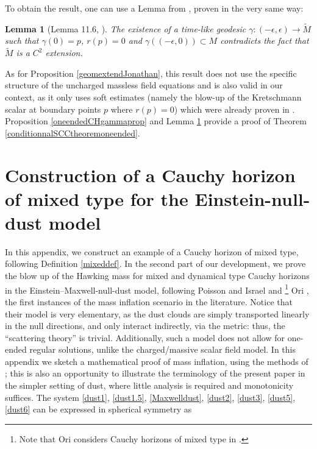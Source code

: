 \documentclass[10pt,a4paper]{article}
\theoremstyle{plain}
\newtheorem{lem}[thm]{Lemma}
\theoremstyle{remark}
\theoremstyle{definition}
\theoremstyle{plain}
\theoremstyle{remark}
\theoremstyle{definition}
\numberwithin{equation}{section}
\begin{document}
To obtain the result, one can use a Lemma from \cite{JonathanStab}, proven in the very same way: 
\begin{lem}[Lemma 11.6, \cite{JonathanStab}] \label{lastlemma}
	The existence of a time-like geodesic $ \gamma:(-\epsilon,\epsilon) \rightarrow \tilde{M}$ such that $\gamma(0)=p$, $r(p)=0$ and $\gamma((-\epsilon,0)) \subset M$ contradicts the fact that $\tilde{M}$ is a $C^2$ extension.
\end{lem}

As for Proposition \ref{geomextendJonathan}, this result does not use the specific structure of the uncharged massless field equations and is also valid in our context, as it only uses soft estimates (namely the blow-up of the Kretschmann scalar at boundary points $p$ where $r(p)=0$) which were already proven in \cite{Kommemi}.  Proposition \ref{oneendedCHgammaprop} and Lemma \ref{lastlemma} provide a proof of Theorem \ref{conditionnalSCCtheoremoneended}.


\appendix



\section{Construction of a Cauchy horizon of mixed type for the Einstein-null-dust model} \label{appendix}

In  this appendix, we construct an example of a Cauchy horizon of mixed type, following Definition \ref{mixeddef}. In the second part of our development, we prove the blow up of the Hawking mass for mixed and dynamical type Cauchy horizons in the Einstein--Maxwell-null-dust model, following Poisson and Israel \cite{PoissonIsrael} and \footnote{Note that Ori considers Cauchy horizons of mixed type in \cite{Ori}.} Ori \cite{Ori}, the first instances of the mass inflation scenario in the literature. Notice that their model is very elementary, as the dust clouds are simply transported linearly in the null directions, and only interact indirectly, via the metric: thus, the ``scattering theory'' is trivial. Additionally, such a model does not allow for one-ended regular solutions, unlike the charged/massive scalar field model.  In this appendix we sketch a mathematical proof of mass inflation, using the methods of \cite{Moi}; this is also an opportunity to illustrate the terminology of the present paper in the simpler setting of dust, where little analysis is required and monotonicity suffices. \color{black} The system \eqref{dust1}, \eqref{dust1.5}, \eqref{Maxwelldust}, \eqref{dust2}, \eqref{dust3}, \eqref{dust5}, \eqref{dust6} can be expressed in spherical symmetry as
\end{document}
